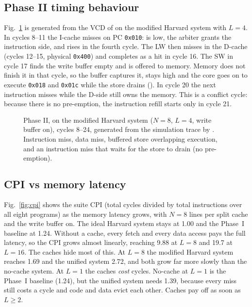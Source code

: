 \subsection{Phase II timing behaviour}
Fig.~\ref{fig:wave2} is generated from the VCD of  on the modified Harvard system
with $L=4$. In cycles 8--11 the I-cache misses on PC \texttt{0x010}:  is low, the
arbiter grants the instruction side, and  rises in the fourth cycle. The LW then
misses in the D-cache (cycles 12--15, physical \texttt{0x400}) and completes as a hit in cycle
16. The SW in cycle 17 finds the write buffer empty and is offered to memory. Memory does not
finish it in that cycle, so the buffer captures it,  stays high and the core goes
on to execute \texttt{0x018} and \texttt{0x01c} while the store drains (). In cycle
20 the next instruction misses while the D-side still owns the memory. This is a conflict cycle:
because there is no pre-emption, the instruction refill starts only in cycle 21.

\begin{figure}[t]
  \centering
  \resizebox{\textwidth}{!}{}
  \caption{Phase II,  on the modified Harvard system ($N=8$, $L=4$, write buffer
  on), cycles 8--24, generated from the simulation trace by . Instruction
  miss, data miss, buffered store overlapping execution, and an instruction miss that waits for
  the store to drain (no pre-emption).}
  \label{fig:wave2}
\end{figure}

\subsection{CPI vs memory latency}
Fig.~\ref{fig:cpi} shows the suite CPI (total cycles divided by total instructions over all
eight programs) as the memory latency grows, with $N=8$ lines per split cache and the write
buffer on. The ideal Harvard system stays at 1.00 and the Phase~I baseline at 1.24. Without a
cache, every fetch and every data access pays the full latency, so the CPI grows almost
linearly, reaching 9.88 at $L=8$ and 19.7 at $L=16$. The caches hide most of this. At $L=8$ the
modified Harvard system reaches 1.69 and the unified system 2.72, and both grow far more slowly
than the no-cache system. At $L=1$ the caches \emph{cost} cycles. No-cache at $L=1$ is the
Phase~I baseline (1.24), but the unified system needs 1.39, because every miss still costs a
cycle and code and data evict each other. Caches pay off as soon as $L\ge2$.

